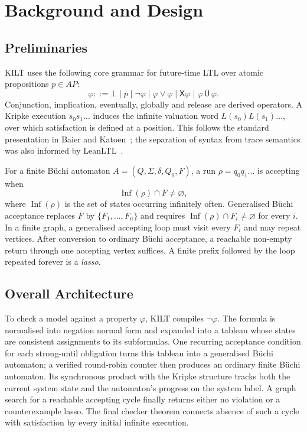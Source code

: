 \section{Background and Design}\label{sec:design}

\subsection{Preliminaries}

KILT uses the following core grammar for future-time LTL over atomic
propositions $p \in AP$:
\[
  \varphi ::= \bot \mid p \mid \neg\varphi
    \mid \varphi \lor \varphi
    \mid \mathsf{X}\varphi
    \mid \varphi\,\mathsf{U}\,\varphi .
\]
Conjunction, implication, eventually, globally and release are derived
operators.  A Kripke execution $s_0s_1\ldots$ induces the infinite valuation
word $L(s_0)L(s_1)\ldots$, over which satisfaction is defined at a position.
This follows the standard presentation in Baier and
Katoen~\cite{BaierKatoen2008}; the separation of syntax from trace semantics
was also informed by LeanLTL~\cite{VinMillerFremont2025}.

For a finite B\"uchi automaton $A=(Q,\Sigma,\delta,Q_0,F)$, a run
$\rho=q_0q_1\ldots$ is accepting when
\[
  \operatorname{Inf}(\rho) \cap F \neq \varnothing,
\]
where $\operatorname{Inf}(\rho)$ is the set of states occurring infinitely
often.  Generalised B\"uchi acceptance replaces $F$ by
$\{F_1,\ldots,F_n\}$ and requires
$\operatorname{Inf}(\rho)\cap F_i\neq\varnothing$ for every $i$.
In a finite graph, a generalised accepting loop must visit every $F_i$ and
may repeat vertices. After conversion to ordinary B\"uchi acceptance, a
reachable non-empty return through one accepting vertex suffices.
A finite prefix followed by the loop repeated forever is a \emph{lasso}.

\subsection{Overall Architecture}

To check a model against a property $\varphi$, KILT compiles $\lnot\varphi$.
The formula is normalised into negation normal form and expanded into a tableau
whose states are consistent assignments to its subformulas.  One recurring
acceptance condition for each strong-until obligation turns this tableau into a
generalised B\"uchi automaton; a verified round-robin counter then produces an
ordinary finite B\"uchi automaton.  Its synchronous product with the Kripke
structure tracks both the current system state and the automaton's progress on
the system label.  A graph search for a reachable accepting cycle finally
returns either no violation or a counterexample lasso.  The final checker
theorem connects absence of such a cycle with satisfaction by every initial
infinite execution.

